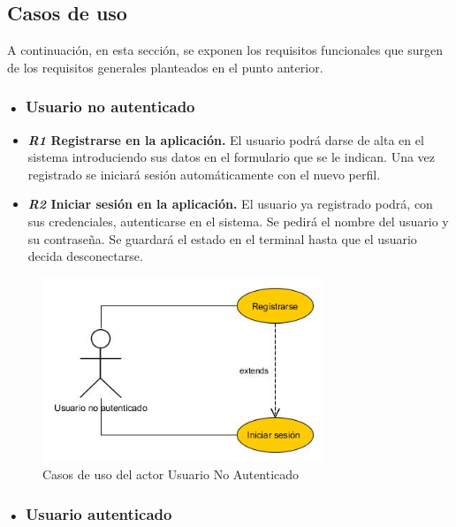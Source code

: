 \subsection{Casos de uso}
A continuación, en esta sección, se exponen los requisitos funcionales que surgen de los requisitos generales planteados en el punto anterior.
\subsubsection{• Usuario no autenticado}
\begin{itemize}
\item\textbf{ \textit{R1}  Registrarse en la aplicación.}
 El usuario podrá darse de alta en el sistema
introduciendo sus datos en el formulario que se le indican. Una vez registrado se iniciará sesión
automáticamente con el nuevo perfil.

\item \textbf{\textit{R2} Iniciar sesión en la aplicación. }
El usuario ya registrado podrá, con
sus credenciales, autenticarse en el  sistema. Se pedirá el nombre del usuario y su contraseña. Se guardará el estado en el terminal hasta que el usuario decida desconectarse.
\end{itemize} 
\begin{figure}[H]
		\centering
		\includegraphics[width=0.75\textwidth] {usuario-no-autenticado.jpg}
		\caption{Casos de uso del actor Usuario No Autenticado }
	\end{figure}
	
	
	
\subsubsection{• Usuario  autenticado}

